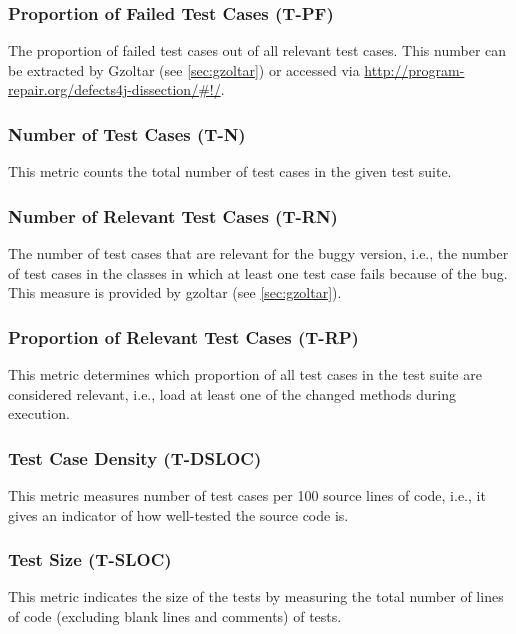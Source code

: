 \subsubsection{Proportion of Failed Test Cases (T-PF)}

The proportion of failed test cases out of all relevant test cases. This number
can be extracted by Gzoltar (see \ref{sec:gzoltar}) or accessed via
\url{http://program-repair.org/defects4j-dissection/#!/}.

\subsubsection{Number of Test Cases (T-N)}

This metric counts the total number of test cases in the given test suite. 

\subsubsection{Number of Relevant Test Cases (T-RN)}

The number of test cases that are relevant for the buggy version, i.e., the
number of test cases in the classes in which at least one test case fails
because of the bug. This measure is provided by gzoltar (see \ref{sec:gzoltar}).

\subsubsection{Proportion of Relevant Test Cases (T-RP)}

This metric determines which proportion of all test cases in the test suite are
considered relevant, i.e., load at least one of the changed methods during
execution.

\subsubsection{Test Case Density (T-DSLOC)}

This metric measures number of test cases per 100 source lines of code, i.e., it gives an indicator of how well-tested the source code is.

\subsubsection{Test Size (T-SLOC)}

This metric indicates the size of the tests by measuring the total number of lines of code (excluding blank lines and comments) of tests.

